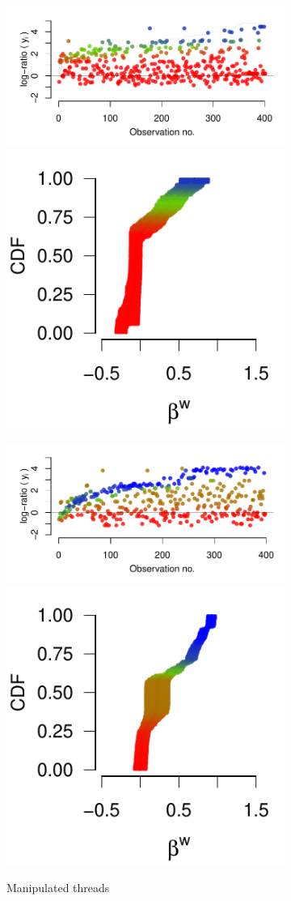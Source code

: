 \documentclass[9pt,a4paper,twocolumn,lineno]{article}
\begin{document}
\begin{figure}
\begin{subfigure}{.49\linewidth}
		{\includegraphics[width=.65\linewidth]{threads/thread_max_403_9}			\includegraphics[width=.33\linewidth]{betas/beta_max_403_9}}
		
		{\includegraphics[width=.65\linewidth]{threads/thread_max_1097_9}			\includegraphics[width=.33\linewidth]{betas/beta_max_1097_9}}

		\vspace{10px}
		\hspace{10px}
		\center Manipulated threads

		\label{fig:supp max}
	\end{subfigure}
	

\end{figure}
\end{document}
